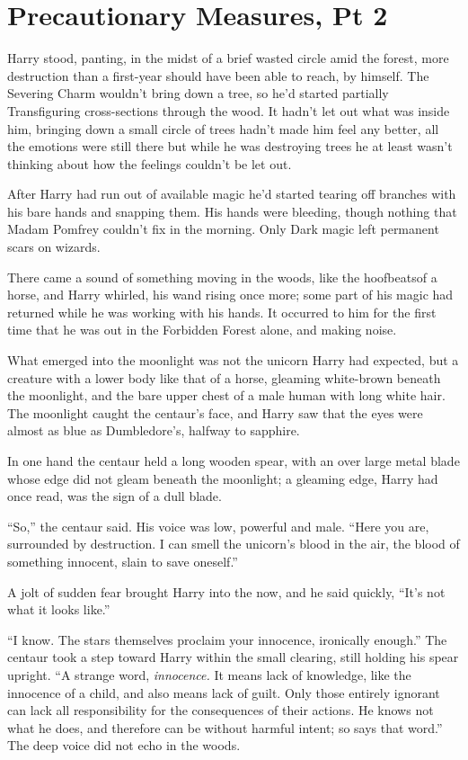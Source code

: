 \chapter{Precautionary Measures, Pt 2}

Harry stood, panting, in the midst of a brief wasted circle amid the forest, more destruction than a first-year should have been able to reach, by himself. The Severing Charm wouldn't bring down a tree, so he'd started partially Transfiguring cross-sections through the wood. It hadn't let out what was inside him, bringing down a small circle of trees hadn't made him feel any better, all the emotions were still there but while he was destroying trees he at least wasn't thinking about how the feelings couldn't be let out.

After Harry had run out of available magic he'd started tearing off branches with his bare hands and snapping them. His hands were bleeding, though nothing that Madam Pomfrey couldn't fix in the morning. Only Dark magic left permanent scars on wizards.

There came a sound of something moving in the woods, like the hoofbeatsof a horse, and Harry whirled, his wand rising once more; some part of his magic had returned while he was working with his hands. It occurred to him for the first time that he was out in the Forbidden Forest alone, and making noise.

What emerged into the moonlight was not the unicorn Harry had expected, but a creature with a lower body like that of a horse, gleaming white-brown beneath the moonlight, and the bare upper chest of a male human with long white hair. The moonlight caught the centaur's face, and Harry saw that the eyes were almost as blue as Dumbledore's, halfway to sapphire.

In one hand the centaur held a long wooden spear, with an over large metal blade whose edge did not gleam beneath the moonlight; a gleaming edge, Harry had once read, was the sign of a dull blade.

``So,'' the centaur said. His voice was low, powerful and male. ``Here you are, surrounded by destruction. I can smell the unicorn's blood in the air, the blood of something innocent, slain to save oneself.''

A jolt of sudden fear brought Harry into the now, and he said quickly, ``It's not what it looks like.''

``I know. The stars themselves proclaim your innocence, ironically enough.'' The centaur took a step toward Harry within the small clearing, still holding his spear upright. ``A strange word, \emph{innocence.} It means lack of knowledge, like the innocence of a child, and also means lack of guilt. Only those entirely ignorant can lack all responsibility for the consequences of their actions. He knows not what he does, and therefore can be without harmful intent; so says that word.'' The deep voice did not echo in the woods.

